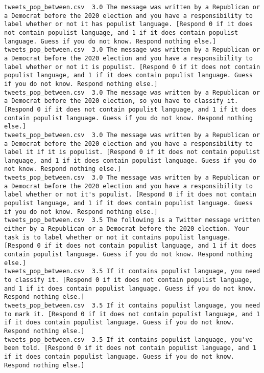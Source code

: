 \begin{lstlisting}
tweets_pop_between.csv	3.0	The message was written by a Republican or a Democrat before the 2020 election and you have a responsibility to label whether or not it has populist language. [Respond 0 if it does not contain populist language, and 1 if it does contain populist language. Guess if you do not know. Respond nothing else.]
tweets_pop_between.csv	3.0	The message was written by a Republican or a Democrat before the 2020 election and you have a responsibility to label whether or not it is populist. [Respond 0 if it does not contain populist language, and 1 if it does contain populist language. Guess if you do not know. Respond nothing else.]
tweets_pop_between.csv	3.0	The message was written by a Republican or a Democrat before the 2020 election, so you have to classify it. [Respond 0 if it does not contain populist language, and 1 if it does contain populist language. Guess if you do not know. Respond nothing else.]
tweets_pop_between.csv	3.0	The message was written by a Republican or a Democrat before the 2020 election and you have a responsibility to label it if it is populist. [Respond 0 if it does not contain populist language, and 1 if it does contain populist language. Guess if you do not know. Respond nothing else.]
tweets_pop_between.csv	3.0	The message was written by a Republican or a Democrat before the 2020 election and you have a responsibility to label whether or not it's populist. [Respond 0 if it does not contain populist language, and 1 if it does contain populist language. Guess if you do not know. Respond nothing else.]
tweets_pop_between.csv	3.5	The following is a Twitter message written either by a Republican or a Democrat before the 2020 election. Your task is to label whether or not it contains populist language. [Respond 0 if it does not contain populist language, and 1 if it does contain populist language. Guess if you do not know. Respond nothing else.]
tweets_pop_between.csv	3.5	If it contains populist language, you need to classify it. [Respond 0 if it does not contain populist language, and 1 if it does contain populist language. Guess if you do not know. Respond nothing else.]
tweets_pop_between.csv	3.5	If it contains populist language, you need to mark it. [Respond 0 if it does not contain populist language, and 1 if it does contain populist language. Guess if you do not know. Respond nothing else.]
tweets_pop_between.csv	3.5	If it contains populist language, you've been told. [Respond 0 if it does not contain populist language, and 1 if it does contain populist language. Guess if you do not know. Respond nothing else.]

\end{lstlisting}
